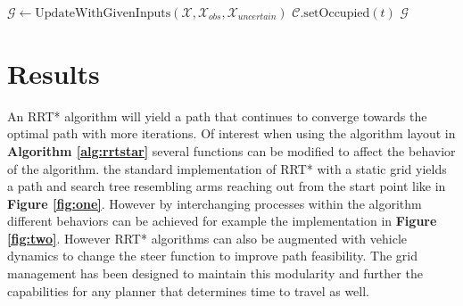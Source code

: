 \documentclass{aiaa-tc}
\begin{document}
\begin{algorithm}[H]
    \caption{Grid Management System}\label{alg:grid}
    $\mathcal{G} \gets \text{UpdateWithGivenInputs}(\mathcal{X}, \mathcal{X}_{obs}, \mathcal{X}_{uncertain})$\;
     {
         {
             {
                 {
                     {
                        $\mathcal{C}.\text{setOccupied}(t)$\;
                    } 
                }
            }
        }
    }
    \Return $\mathcal{G}$\;
\end{algorithm}
\pagebreak
\section{Results}
An RRT* algorithm will yield a path that continues to converge towards the optimal path with more iterations. Of interest when using the algorithm layout in \textbf{Algorithm \ref{alg:rrtstar}} several functions can
be modified to affect the behavior of the algorithm. the standard implementation of RRT* with a static grid yields a path and search tree resembling arms reaching out from the start point like in \textbf{Figure \ref{fig:one}}. However
by interchanging processes within the algorithm different behaviors can be achieved for example the implementation in \textbf{Figure \ref{fig:two}}. However RRT* algorithms can also
be augmented with vehicle dynamics to change the steer function to improve path feasibility. The grid management has been designed to maintain this modularity and further the capabilities for any planner that
determines time to travel as well.
\end{document}
